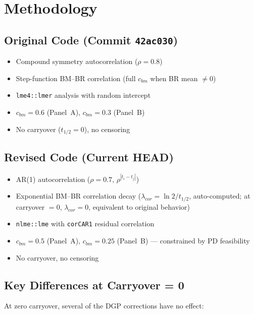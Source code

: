 \documentclass[11pt]{article}
\begin{document}
\section{Methodology}

\subsection{Original Code (Commit \texttt{42ac030})}

\begin{itemize}[nosep]
\item Compound symmetry autocorrelation ($\rho = 0.8$)
\item Step-function BM--BR correlation (full $c_{bm}$ when
  BR mean $\neq 0$)
\item \texttt{lme4::lmer} analysis with random intercept
\item $c_{bm} = 0.6$ (Panel~A), $c_{bm} = 0.3$ (Panel~B)
\item No carryover ($t_{1/2} = 0$), no censoring
\end{itemize}

\subsection{Revised Code (Current HEAD)}

\begin{itemize}[nosep]
\item AR(1) autocorrelation ($\rho = 0.7$,
  $\rho^{|t_i - t_j|}$)
\item Exponential BM--BR correlation decay
  ($\lambda_{cor} = \ln 2 / t_{1/2}$, auto-computed;
  at carryover $= 0$, $\lambda_{cor} = 0$, equivalent
  to original behavior)
\item \texttt{nlme::lme} with \texttt{corCAR1} residual
  correlation
\item $c_{bm} = 0.5$ (Panel~A), $c_{bm} = 0.25$ (Panel~B)
  --- constrained by PD feasibility
\item No carryover, no censoring
\end{itemize}

\subsection{Key Differences at Carryover = 0}

At zero carryover, several of the DGP corrections have no
effect:
\end{document}
